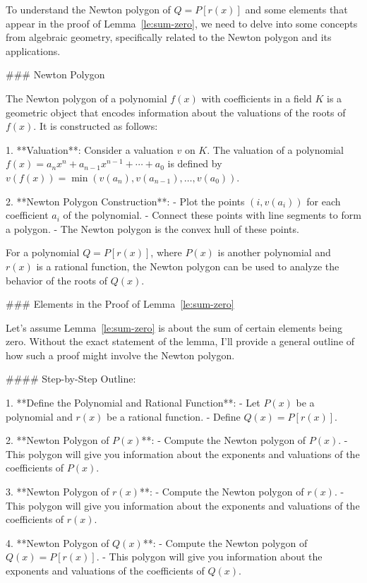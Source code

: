 To understand the Newton polygon of \( Q = P[r(x)] \) and some elements that appear in the proof of Lemma~\ref{le:sum-zero}, we need to delve into some concepts from algebraic geometry, specifically related to the Newton polygon and its applications.

### Newton Polygon

The Newton polygon of a polynomial \( f(x) \) with coefficients in a field \( K \) is a geometric object that encodes information about the valuations of the roots of \( f(x) \). It is constructed as follows:

1. **Valuation**: Consider a valuation \( v \) on \( K \). The valuation of a polynomial \( f(x) = a_n x^n + a_{n-1} x^{n-1} + \cdots + a_0 \) is defined by \( v(f(x)) = \min(v(a_n), v(a_{n-1}), \ldots, v(a_0)) \).

2. **Newton Polygon Construction**:
   - Plot the points \( (i, v(a_i)) \) for each coefficient \( a_i \) of the polynomial.
   - Connect these points with line segments to form a polygon.
   - The Newton polygon is the convex hull of these points.

For a polynomial \( Q = P[r(x)] \), where \( P(x) \) is another polynomial and \( r(x) \) is a rational function, the Newton polygon can be used to analyze the behavior of the roots of \( Q(x) \).

### Elements in the Proof of Lemma~\ref{le:sum-zero}

Let's assume Lemma~\ref{le:sum-zero} is about the sum of certain elements being zero. Without the exact statement of the lemma, I'll provide a general outline of how such a proof might involve the Newton polygon.

#### Step-by-Step Outline:

1. **Define the Polynomial and Rational Function**:
   - Let \( P(x) \) be a polynomial and \( r(x) \) be a rational function.
   - Define \( Q(x) = P[r(x)] \).

2. **Newton Polygon of \( P(x) \)**:
   - Compute the Newton polygon of \( P(x) \).
   - This polygon will give you information about the exponents and valuations of the coefficients of \( P(x) \).

3. **Newton Polygon of \( r(x) \)**:
   - Compute the Newton polygon of \( r(x) \).
   - This polygon will give you information about the exponents and valuations of the coefficients of \( r(x) \).

4. **Newton Polygon of \( Q(x) \)**:
   - Compute the Newton polygon of \( Q(x) = P[r(x)] \).
   - This polygon will give you information about the exponents and valuations of the coefficients of \( Q(x) \).

